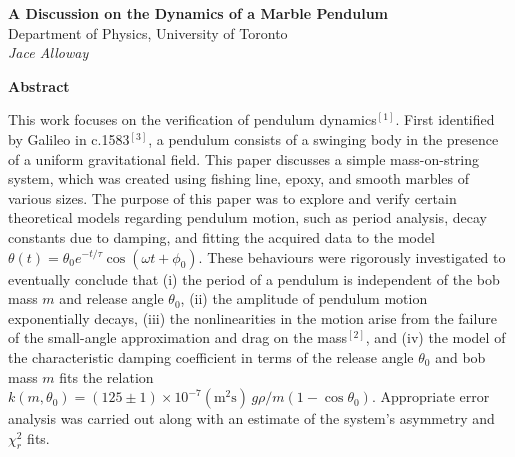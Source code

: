 \documentclass[11pt]{article}
\begin{document}
\begin{center}
    \Large {}  \textbf{A Discussion on the Dynamics of a Marble Pendulum}\\
    \vspace{5pt} 
    \large Department of Physics, University of Toronto\\
    \vspace{5pt}
    \textit{Jace Alloway}
\end{center}

\nd \hrulefill

\vspace{15pt}




 \selectfont \textbf{Abstract}

 \selectfont This work focuses on the verification of pendulum dynamics$^{[1]}$. First identified by Galileo in c.1583$^{[3]}$, a pendulum consists of a swinging body in the presence of a uniform gravitational field. This paper discusses a simple mass-on-string system, which was created using fishing line, epoxy, and smooth marbles of various sizes. The purpose of this paper was to explore and verify certain theoretical models regarding pendulum motion, such as period analysis, decay constants due to damping, and fitting the acquired data to the model $\theta(t) = \theta_0e^{-t/\tau}\cos(\omega t + \phi_0)$. These behaviours were rigorously investigated to eventually conclude that (i) the period of a pendulum is independent of the bob mass $m$ and release angle $\theta_0$,  (ii) the amplitude of pendulum motion exponentially decays, (iii) the nonlinearities in the motion arise from the failure of the small-angle approximation and drag on the mass$^{[2]}$, and (iv) the model of the characteristic damping coefficient in terms of the release angle $\theta_0$ and bob mass $m$ fits the relation $k(m, \theta_0) = (125\pm 1)\times 10^{-7}(\text{m}^2\text{s})\, g\rho/m(1-\cos\theta_0)$. Appropriate error analysis was carried out along with an estimate of the system's asymmetry and $\chi^2_r$ fits.


\vspace{5pt}

\nd \hrulefill

\vspace{5pt}
\end{document}
